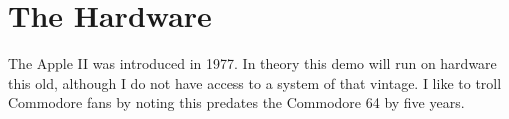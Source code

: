 \documentclass[twocolumn]{article}
\begin{document}






%

\section{The Hardware}

The Apple II was introduced in 1977.
In theory this demo will run on hardware this old, although I do
not have access to a system of that vintage.
I like to troll Commodore fans by noting this predates the Commodore 64 by 
five years.
\end{document}
